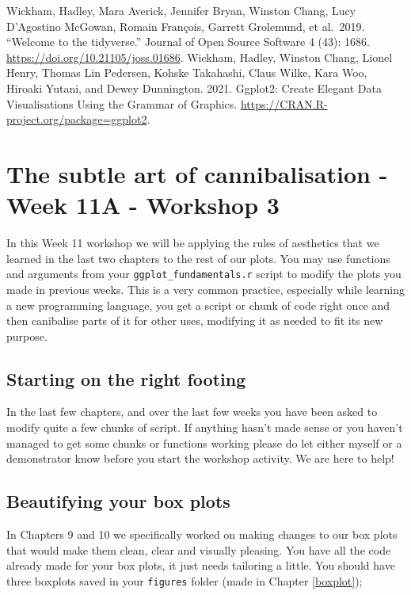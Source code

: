 \documentclass[
]{book}
\begin{document}
Wickham, Hadley, Mara Averick, Jennifer Bryan, Winston Chang, Lucy D'Agostino McGowan, Romain François, Garrett Grolemund, et al.~2019. ``Welcome to the tidyverse.'' Journal of Open Source Software 4 (43): 1686. \url{https://doi.org/10.21105/joss.01686}.
Wickham, Hadley, Winston Chang, Lionel Henry, Thomas Lin Pedersen, Kohske Takahashi, Claus Wilke, Kara Woo, Hiroaki Yutani, and Dewey Dunnington. 2021. Ggplot2: Create Elegant Data Visualisations Using the Grammar of Graphics. \url{https://CRAN.R-project.org/package=ggplot2}.

\hypertarget{cannibalisation}{%
\chapter{The subtle art of cannibalisation - Week 11A - Workshop 3}\label{cannibalisation}}

In this Week 11 workshop we will be applying the rules of aesthetics that we learned in the last two chapters to the rest of our plots. You may use functions and arguments from your \texttt{ggplot\_fundamentals.r} script to modify the plots you made in previous weeks. This is a very common practice, especially while learning a new programming language, you get a script or chunk of code right once and then canibalise parts of it for other uses, modifying it as needed to fit its new purpose.

\hypertarget{starting-on-the-right-footing}{%
\section{Starting on the right footing}\label{starting-on-the-right-footing}}

In the last few chapters, and over the last few weeks you have been asked to modify quite a few chunks of script. If anything hasn't made sense or you haven't managed to get some chunks or functions working please do let either myself or a demonstrator know before you start the workshop activity. We are here to help!

\hypertarget{beautifying-your-box-plots}{%
\section{Beautifying your box plots}\label{beautifying-your-box-plots}}

In Chapters 9 and 10 we specifically worked on making changes to our box plots that would make them clean, clear and visually pleasing. You have all the code already made for your box plots, it just needs tailoring a little. You should have three boxplots saved in your \texttt{figures} folder (made in Chapter \ref{boxplot});
\end{document}
